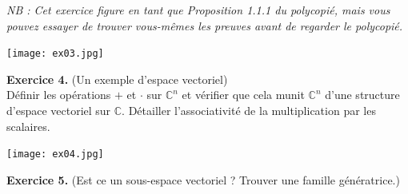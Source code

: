 \documentclass[a4paper, 10pt]{report}
\begin{document}
	\noindent
	\textit{NB : Cet exercice figure en tant que Proposition 1.1.1 du
		polycopié, mais vous pouvez essayer de trouver vous-mêmes
		les preuves avant de regarder le polycopié.}
	
	\texttt{[image: ex03.jpg]}
	
	\newpage
	
	\noindent
	\textbf{Exercice 4.} (Un exemple d'espace vectoriel)\\
	Définir les opérations $+$ et $\cdot$ sur $\mathbb{C}^n$ et
	vérifier que cela munit $\mathbb{C}^n$ d'une structure d'espace
	vectoriel sur $\mathbb{C}$. Détailler l'associativité de la
	multiplication par les scalaires.
	
	\texttt{[image: ex04.jpg]}
	
	\newpage
	
	\noindent
	\textbf{Exercice 5.} (Est ce un sous-espace vectoriel ?
	Trouver une famille génératrice.)
	
\end{document}
